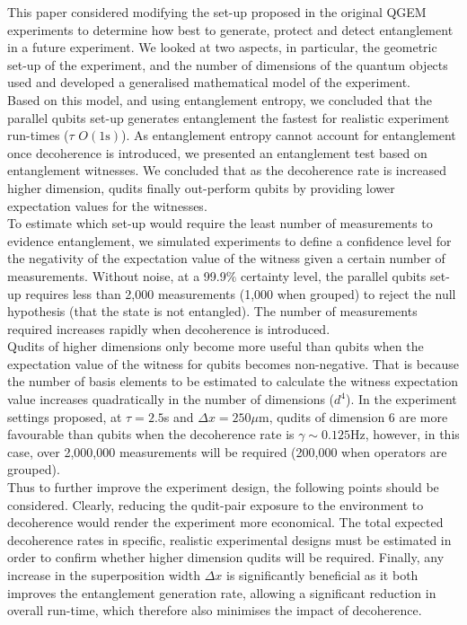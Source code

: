 \documentclass[%
 12pt,
 superscriptaddress,
 amsmath,
 amssymb,
 onecolumn,
 longbibliography
]{revtex4-2}
\begin{document}
\indent This paper considered modifying the set-up proposed in the original QGEM experiments to determine how best to generate, protect and detect entanglement in a future experiment. We looked at two aspects, in particular, the geometric set-up of the experiment, and the number of dimensions of the quantum objects used and developed a generalised mathematical model of the experiment. \\
\indent Based on this model, and using entanglement entropy, we concluded that the parallel qubits set-up generates entanglement the fastest for realistic experiment run-times ($\tau$ $O\left(1\mathrm{s}\right)$). As entanglement entropy cannot account for entanglement once decoherence is introduced, we presented an entanglement test based on entanglement witnesses. We concluded that as the decoherence rate is increased higher dimension, qudits finally out-perform qubits by providing lower expectation values for the witnesses. \\
\indent To estimate which set-up would require the least number of measurements to evidence entanglement, we simulated experiments to define a confidence level for the negativity of the expectation value of the witness given a certain number of measurements. Without noise, at a 99.9$\%$ certainty level, the parallel qubits set-up requires less than 2,000 measurements (1,000 when grouped) to reject the null hypothesis (that the state is not entangled). The number of measurements required increases rapidly when decoherence is introduced. \\
\indent Qudits of higher dimensions only become more useful than qubits when the expectation value of the witness for qubits becomes non-negative. That is because the number of basis elements to be estimated to calculate the witness expectation value increases quadratically in the number of dimensions ($d^4$). In the experiment settings proposed, at $\tau=2.5$s and $\Delta x = 250 \mu$m, qudits of dimension 6 are more favourable than qubits when the decoherence rate is $\gamma\sim0.125$Hz, however, in this case, over 2,000,000 measurements will be required (200,000 when operators are grouped). \\
\indent Thus to further improve the experiment design, the following points should be considered. Clearly, reducing the qudit-pair exposure to the environment to decoherence would render the experiment more economical. The total expected decoherence rates in specific, realistic experimental designs must be estimated in order to confirm whether higher dimension qudits will be required. Finally, any increase in the superposition width $\Delta x$ is significantly beneficial as it both improves the entanglement generation rate, allowing a significant reduction in overall run-time, which therefore also minimises the impact of decoherence. 
\end{document}

